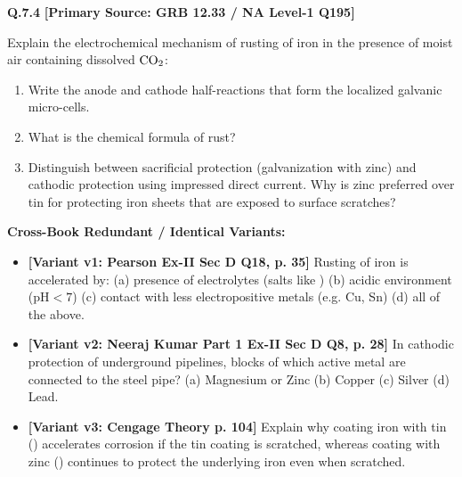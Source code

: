 \begin{problembox}
\textbf{Q.7.4} \hfill \textbf{[Primary Source: GRB  12.33 / NA Level-1 Q195]}
\label{q:qb-c7-04}

Explain the electrochemical mechanism of rusting of iron in the presence of moist air containing dissolved $\ce{CO2}$:
\begin{enumerate}[label=(\alph*)]
    \item Write the anode and cathode half-reactions that form the localized galvanic micro-cells.
    \item What is the chemical formula of rust?
    \item Distinguish between sacrificial protection (galvanization with zinc) and cathodic protection using impressed direct current. Why is zinc preferred over tin for protecting iron sheets that are exposed to surface scratches?
\end{enumerate}

\tcbline
\textbf{\color{accentamber}Cross-Book Redundant / Identical Variants:}
\begin{itemize}[leftmargin=*,itemsep=2pt]
    \item \textbf{[Variant v1: Pearson Ex-II Sec D Q18, p. 35]} Rusting of iron is accelerated by: (a) presence of electrolytes (salts like ) (b) acidic environment ($\text{pH} < 7$) (c) contact with less electropositive metals (e.g. Cu, Sn) (d) all of the above.
    \item \textbf{[Variant v2: Neeraj Kumar Part 1 Ex-II Sec D Q8, p. 28]} In cathodic protection of underground pipelines, blocks of which active metal are connected to the steel pipe? (a) Magnesium or Zinc (b) Copper (c) Silver (d) Lead.
    \item \textbf{[Variant v3: Cengage Theory p. 104]} Explain why coating iron with tin () accelerates corrosion if the tin coating is scratched, whereas coating with zinc () continues to protect the underlying iron even when scratched.
\end{itemize}
\end{problembox}
